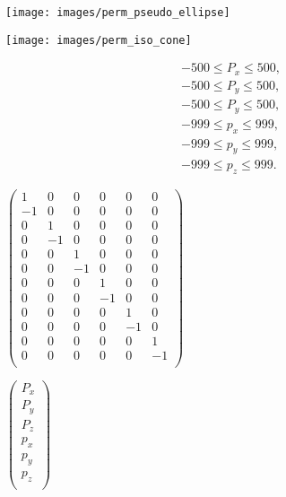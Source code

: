 \documentclass[a4paper,11pt,twoside,openright]{book}
\def\lthtmlcheckvsize{\ifdim\ht\sizebox<\vsize 
  \ifdim\wd\sizebox<\hsize\expandafter\hfill\fi \expandafter\vfill
  \else\expandafter\vss\fi}%
\begin{document}
{\newpage\clearpage
{}%
\texttt{[image: images/perm\_pseudo\_ellipse]}%
\lthtmlpictureZ
\lthtmlcheckvsize\clearpage}

{\newpage\clearpage
{}%
\texttt{[image: images/perm\_iso\_cone]}%
\lthtmlpictureZ
\lthtmlcheckvsize\clearpage}

{\newpage\clearpage
\setcounter{equation}{78}
%
\begin{subequations}\begin{gather}
-500 \leqslant P_x\leqslant 500, \\
-500 \leqslant P_y\leqslant 500, \\
-500 \leqslant P_y\leqslant 500, \\
-999 \leqslant p_x\leqslant 999, \\
-999 \leqslant p_y\leqslant 999, \\
-999 \leqslant p_z\leqslant 999.
\end{gather}\end{subequations}%
\lthtmldisplayZ
\lthtmlcheckvsize\clearpage}

{\newpage\clearpage
{}%
$\displaystyle \begin{pmatrix}
1 & 0 & 0 & 0 & 0 & 0 \\
-1 & 0 & 0 & 0 & 0 & 0 \\
0 & 1 & 0 & 0 & 0 & 0 \\
0 &-1 & 0 & 0 & 0 & 0 \\
0 & 0 & 1 & 0 & 0 & 0 \\
0 & 0 &-1 & 0 & 0 & 0 \\
0 & 0 & 0 & 1 & 0 & 0 \\
0 & 0 & 0 &-1 & 0 & 0 \\
0 & 0 & 0 & 0 & 1 & 0 \\
0 & 0 & 0 & 0 &-1 & 0 \\
0 & 0 & 0 & 0 & 0 & 1 \\
0 & 0 & 0 & 0 & 0 &-1 \\
\end{pmatrix}$%
\lthtmlindisplaymathZ
\lthtmlcheckvsize\clearpage}

{\newpage\clearpage
{}%
$\displaystyle \begin{pmatrix}
P_x\\
P_y\\
P_z\\
p_x\\
p_y\\
p_z\\
\end{pmatrix}$%
\lthtmlindisplaymathZ
\lthtmlcheckvsize\clearpage}
\end{document}

